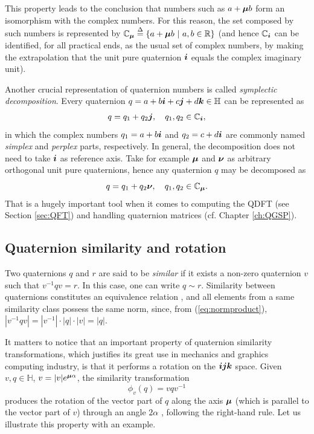 This property leads to the conclusion that numbers such as $ a + \boldsymbol{\mu} b  $ form an isomorphism with the complex numbers. For this reason, the set composed by such numbers is represented by $ \mathbb{C}_{\boldsymbol{\mu}} \overset{\Delta}{=} \{ a + \boldsymbol{\mu} b \ |\  a, b \in \mathbb{R} \}$ (and hence $ \mathbb{C}_{\boldsymbol{i}} $ can be identified, for all practical ends, as the usual set of complex numbers, by making the extrapolation that the unit pure quaternion $\boldsymbol{i}$ equals the complex imaginary unit).

Another crucial representation of quaternion numbers is called \emph{symplectic decomposition}. Every quaternion $ q = a + b\boldsymbol{i} + c\boldsymbol{j} + d\boldsymbol{k} \in \mathbb{H} $ can be represented as
\begin{equation}
q = q_1 + q_2 \boldsymbol{j}, \quad q_1, q_2 \in \mathbb{C}_{\boldsymbol{i}},
\end{equation}
in which the complex numbers $ q_1 = a + b\boldsymbol{i} $ and $ q_2 = c + d\boldsymbol{i} $ are commonly named \emph{simplex} and \emph{perplex} parts, respectively. In general, the decomposition does not need to take $\boldsymbol{i}$ as reference axis. Take for example $ \boldsymbol{\mu} $ and $ \boldsymbol{\nu} $ as arbitrary orthogonal unit pure quaternions, hence any quaternion $ q $ may be decomposed as
\begin{equation}
\label{eq:decomposicao}
q = q_1 + q_2 \boldsymbol{\nu}, \quad q_1, q_2 \in \mathbb{C}_{\boldsymbol{\mu}}.
\end{equation}
That is a hugely important tool when it comes to computing the QDFT (see Section \ref{sec:QFT}) and handling quaternion matrices (cf. Chapter \ref{ch:QGSP}).

\subsection{Quaternion similarity and rotation}
\label{subsec:rotacionando}
Two quaternions $ q $ and $ r $ are said to be \emph{similar} if it exists a non-zero quaternion $ v $ such that $ v^{-1}q v = r $. In this case, one can write $ q \sim r $. Similarity between quaternions constitutes an equivalence relation \cite{zhang1997quaternions}, and all elements from a same similarity class possess the same norm, since, from (\ref{eq:normproduct}), $ |v^{-1}q v| = |v^{-1}| \cdot |q| \cdot |v| = |q| $.

It matters to notice that an important property of quaternion similarity transformations, which justifies its great use in mechanics and graphics computing industry, is that it performs a rotation on the $\boldsymbol{i} \boldsymbol{j} \boldsymbol{k}$ space. Given $ v,q \in \mathbb{H} $, $ v = |v| e^{\boldsymbol{\mu} \alpha}$, the similarity transformation
\begin{equation}
\label{eq:rotacao}
\phi_v(q) = v q v^{-1}
\end{equation}
produces the rotation of the vector part of $q$ along the axis $ \boldsymbol{\mu} $ (which is parallel to the vector part of $v$) through an angle $ 2\alpha $ \cite{ward2012quaternions}, following the right-hand rule. Let us illustrate this property with an example.

